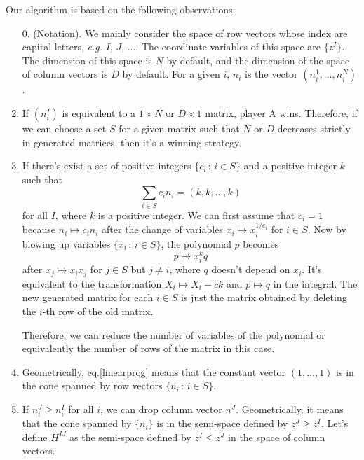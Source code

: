 \documentclass[12pt]{article}
\theoremstyle{definition}
\theoremstyle{plain}
\begin{document}
Our algorithm is based on the following observations:
\begin{enumerate}
	\item[0.](Notation). We mainly consider the space of row vectors whose index are 
	capital letters, \textit{e.g.} $I$, $J$, .... 
	The coordinate variables of this space are $\{z^I\}$.
	The dimension of this space is $N$ by default, and the dimension of the space
	of column vectors is $D$ by default. For a given $i$, $n_i$ is the vector
	$(n_i^1,\dots,n_i^N)$.
	
	\item If $(n^I_i)$ is equivalent to a $1\times N$ or $D\times 1$ matrix, player A wins. 
	Therefore, if we can choose a set $S$ for a given matrix such that $N$ or $D$ 
	decreases strictly in generated matrices, then it's a winning strategy.


	\item If there's exist a set of positive integers $\{c_i\,:\,i\in S\}$ and a 
	positive integer $k$ such that
	\begin{equation}\label{linearprog}
		\sum_{i\in S} c_i n_i = (k,k,\dots,k)
	\end{equation}	
	for all $I$, where $k$ is a positive integer. 
	We can first assume that $c_i=1$ because $n_i\mapsto c_i n_i$ after the 
	change of variables $x_i\mapsto x_i^{1/c_i}$ for $i\in S$.
	Now by blowing up variables $\{x_i\,:\, i\in S\}$, the polynomial $p$ becomes
	\[
		p\mapsto x_i^k q
	\]
	after $x_j\mapsto x_ix_j$ for $j\in S$ but $j\neq i$, where $q$ doesn't depend on $x_i$.
	It's equivalent to the transformation $X_i\mapsto X_i-ck$ and $p\mapsto q$ 
	in the integral. The new generated matrix for each $i\in S$ is just the matrix
	obtained by deleting the $i$-th row of the old matrix.
	
	Therefore, we can reduce the number of variables of the polynomial or equivalently 
	the number of rows of the matrix in this case.

	\item Geometrically, eq.\eqref{linearprog} means that the constant vector $(1,\dots,1)$ 
	is in the cone spanned by row vectors $\{n_i\,:\,i\in S\}$. 

	\item If $n^J_i \geq n^I_i$ for all $i$, we can drop column vector $n^J$. Geometrically, 
	it means that the cone spanned by $\{n_i\}$ is in the semi-space defined by $z^J\geq z^I$.
	Let's define $H^{IJ}$ as the semi-space defined by $z^I\leq z^J$ in the space of 
	column vectors.
	

\end{enumerate}
\end{document}
